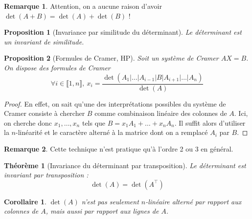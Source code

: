\documentclass[french]{book}
\theoremstyle{plain}
\newtheorem{thm}{Théorème}[chapter]
\newtheorem{prop}{Proposition}[chapter]
\newtheorem{cor}{Corollaire}[chapter]
\theoremstyle{definition}
\newtheorem{rmq}{Remarque}[chapter]
\theoremstyle{remark}
\begin{document}
\begin{rmq} Attention, on a aucune raison d'avoir $\det(A+B)=\det(A)+\det(B)$ ! \end{rmq}
\begin{prop}[Invariance par similitude du déterminant]
	Le déterminant est un invariant de similitude.
\end{prop}
\begin{prop}[Formules de Cramer, HP]
	Soit un système de Cramer $AX=B$. On dispose des formules de Cramer $$\forall i \in\llbracket1,n\rrbracket,\ x_i=\frac{\det\left(A_1|\ldots|A_{i-1}|B|A_{i+1}|\ldots|A_n\right)}{\det(A)}$$
\end{prop}
\begin{proof}
	En effet, on sait qu'une des interprétations possibles du système de Cramer consiste à chercher $B$ comme combinaison linéaire des colonnes de $A$. Ici, on cherche donc $x_1,\ldots,x_n$ tels que $B=x_1A_1+\ldots+x_nA_n$. Il suffit alors d'utiliser la $n$-linéarité et le caractère alterné à la matrice dont on a remplacé $A_i$ par $B$.
\end{proof}
\begin{rmq} Cette technique n'est pratique qu'à l'ordre 2 ou 3 en général. \end{rmq}
\begin{thm}[Invariance du déterminant par transposition]
	Le déterminant est invariant par transposition : $$\det(A)=\det(A^\top)$$
\end{thm}
\begin{cor}
	$\det(A)$ n'est pas seulement $n$-linéaire alterné par rapport aux colonnes de $A$, mais aussi par rapport aux lignes de $A$.
\end{cor}
\end{document}
